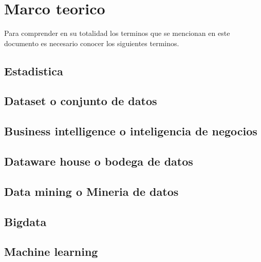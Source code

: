 \section{Marco teorico}
 Para comprender en su totalidad los terminos que se mencionan en este documento es necesario conocer los siguientes terminos.
 
 \subsection{Estadistica}
 \subsection{Dataset o conjunto de datos}
 \subsection{Business intelligence o inteligencia de negocios}
 \subsection{Dataware house o bodega de datos}
 \subsection{Data mining o Mineria de datos}
 \subsection{Bigdata}
 \subsection{Machine learning}